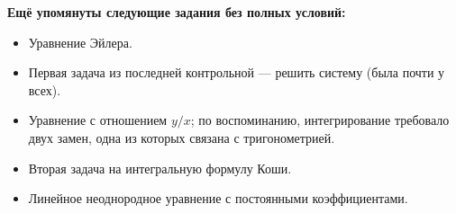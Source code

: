 \documentclass[11pt,a4paper]{article}
\begin{document}
\vspace{5pt}
\textbf{Ещё упомянуты следующие задания без полных условий:}
\begin{itemize}
 \item Уравнение Эйлера.
 \item Первая задача из последней контрольной --- решить систему
       (была почти у всех).
 \item Уравнение с отношением $y/x$; по воспоминанию, интегрирование
       требовало двух замен, одна из которых связана с тригонометрией.
 \item Вторая задача на интегральную формулу Коши.
 \item Линейное неоднородное уравнение с постоянными коэффициентами.
\end{itemize}
\end{document}
